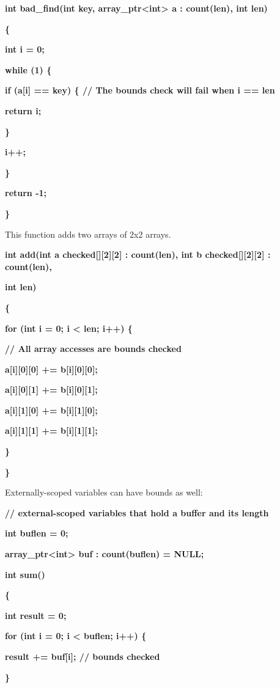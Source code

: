 \documentclass[]{article}
\begin{document}
\textbf{int bad\_find(int key, array\_ptr\textless{}int\textgreater{} a
: count(len), int len)}

\textbf{\{}

\textbf{int i = 0;}

\textbf{while (1) \{}

\textbf{if (a{[}i{]} == key) \{ // The bounds check will fail when i ==
len}

\textbf{return i;}

\textbf{\}}

\textbf{i++;}

\textbf{\}}

\textbf{return -1;}

\textbf{\}}

This function adds two arrays of 2x2 arrays.

\textbf{int add(int a checked{[}{]}{[}2{]}{[}2{]} : count(len), int b
checked{[}{]}{[}2{]}{[}2{]} : count(len), }

\textbf{int len) }

\textbf{\{}

\textbf{for (int i = 0; i \textless{} len; i++) \{}

\textbf{// All array accesses are bounds checked}

\textbf{a{[}i{]}{[}0{]}{[}0{]} += b{[}i{]}{[}0{]}{[}0{]}; }

\textbf{a{[}i{]}{[}0{]}{[}1{]} += b{[}i{]}{[}0{]}{[}1{]};}

\textbf{a{[}i{]}{[}1{]}{[}0{]} += b{[}i{]}{[}1{]}{[}0{]};}

\textbf{a{[}i{]}{[}1{]}{[}1{]} += b{[}i{]}{[}1{]}{[}1{]};}

\textbf{\}}

\textbf{\}}

Externally-scoped variables can have bounds as well:

\textbf{// external-scoped variables that hold a buffer and its length}

\textbf{int buflen = 0;}

\textbf{array\_ptr\textless{}int\textgreater{} buf : count(buflen) =
NULL;}

\textbf{int sum()}

\textbf{\{}

\textbf{int result = 0;}

\textbf{for (int i = 0; i \textless{} buflen; i++) \{}

\textbf{result += buf{[}i{]}; // bounds checked}

\textbf{\}}
\end{document}
